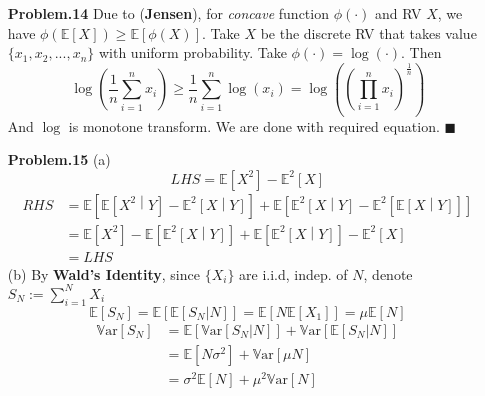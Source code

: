 \documentclass[a4paper, 11pt]{article}
\begin{document}
\begin{itemize}
	\item[\textbf{Problem.14}] Due to (\textbf{Jensen}), for \textit{concave} function $\phi(\cdot)$ and RV $X$, we have $\phi(\mathbb{E}\left[X\right])\geq \mathbb{E}\left[\phi(X)\right]$. Take $X$ be the discrete RV that takes value $\{x_1, x_2, ..., x_n\}$ with uniform probability. Take $\phi(\cdot)=\log(\cdot)$. Then
	\begin{equation}
		\log\left(\frac{1}{n}\sum_{i=1}^n x_i\right) \geq \frac{1}{n}\sum_{i=1}^n \log(x_i) = \log\left(\left(\prod_{i=1}^n x_i\right)^{\frac{1}{n}}\right)
	\end{equation}
	And $\log$ is monotone transform. We are done with required equation. $\blacksquare$
\end{itemize}

\begin{itemize}
	\item[\textbf{Problem.15}] (a)
	\begin{equation}
		LHS = \mathbb{E}\left[X^2\right]-\mathbb{E}^2\left[X\right]
	\end{equation}
	\begin{equation}
		\begin{split}
			RHS &= \mathbb{E}\left[\mathbb{E}\left[X^2\middle|Y\right]-\mathbb{E}^2\left[X\middle|Y\right]\right]+\mathbb{E}\left[\mathbb{E}^2\left[X\middle|Y\right]-\mathbb{E}^2\left[\mathbb{E}\left[X\middle|Y\right]\right]\right]	\\
			&=\mathbb{E}\left[X^2\right]-\mathbb{E}\left[\mathbb{E}^2\left[X\middle|Y\right]\right]+\mathbb{E}\left[\mathbb{E}^2\left[X\middle|Y\right]\right]-\mathbb{E}^2\left[X\right]\\
			&=LHS
		\end{split}
	\end{equation}
	(b) By \textbf{Wald's Identity}, since $\{X_i\}$ are i.i.d, indep. of $N$, denote $S_N:=\sum_{i=1}^N X_i$
	\begin{equation}
		\mathbb{E}\left[S_N\right] = \mathbb{E}\left[\mathbb{E}\left[S_N|N\right]\right] = \mathbb{E}\left[N \mathbb{E}\left[X_1\right]\right] = \mu \mathbb{E}\left[N\right]
	\end{equation}
	\begin{equation}
		\begin{split}
			\mathrm{\mathbb{V}ar}\left[S_N\right] &= \mathbb{E}\left[\mathrm{\mathbb{V}ar}\left[S_N|N\right]\right] + \mathrm{\mathbb{V}ar}\left[\mathbb{E}\left[S_N|N\right]\right]\\
			&=\mathbb{E}\left[N\sigma^2\right] + \mathrm{\mathbb{V}ar}\left[\mu N\right]\\
			&=\sigma^2 \mathbb{E}\left[N\right] + \mu^2 \mathrm{\mathbb{V}ar}\left[N\right]
		\end{split}
	\end{equation}
\end{itemize}
\end{document}
